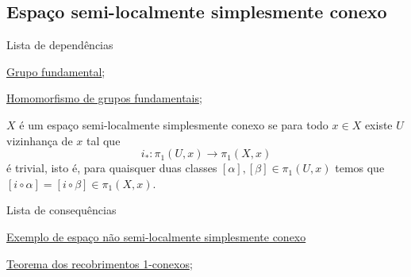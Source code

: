 \subsection{Espaço semi-localmente simplesmente conexo}
\label{espaço-semi-localmente-simplesmente-conexo-def}
\begin{titlemize}{Lista de dependências}
	\item \hyperref[grupo-fundamental-def]{Grupo fundamental};\\ %
	\item \hyperref[hom-grupo-fundamental]{Homomorfismo de grupos fundamentais};\\
\end{titlemize}
\begin{defi}
	$X$ é um espaço semi-localmente simplesmente conexo se para todo $x\in X$ existe $U$ vizinhança de $x$ tal que $$i_*: \pi_1(U,x)\rightarrow\pi_1(X,x)$$ é trivial, isto é, para quaisquer duas classes $[\alpha],[\beta] \in \pi_1(U,x)$ temos que $[i\circ \alpha]=[i\circ \beta]\in \pi_1(X,x)$.
\end{defi}
 

\begin{titlemize}{Lista de consequências}
    \item \hyperref[não-semi-localmente-simplesmente-conexo-ex]{Exemplo de espaço não semi-localmente simplesmente conexo}
	\item \hyperref[recobrimento-1-conexo-prop]{Teorema dos recobrimentos 1-conexos};\\ %
\end{titlemize}

